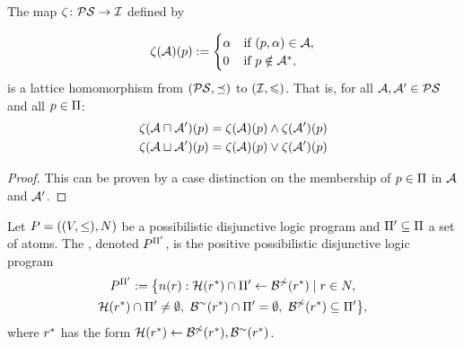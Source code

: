 \begin{proposition}
    The map $\PintToFint\colon\Pint\to\Fint$ defined by

    \[
        \PintToFint(\pint)(\atom)\eqdef
        \begin{cases}
            \lelem & \text{if } (\atom, \lelem) \in\pint, \\
            \least & \text{if } \atom\notin \proj[\pint],
        \end{cases}
    \]
    is a lattice homomorphism from $(\Pint,\possleq)$ to $(\Fint,\lleq)$.
    That is, for all $\pint,\pintalt\in\Pint$ and all $\atom\in \Atoms$:
    \begin{align}
        \PintToFint(\pint\possglb\pintalt)(\atom) & = \PintToFint(\pint)(\atom)\glb\PintToFint(\pintalt)(\atom) \\
        \PintToFint(\pint\posslub\pintalt)(\atom) & = \PintToFint(\pint)(\atom)\lub\PintToFint(\pintalt)(\atom)
    \end{align}
    \begin{proof}
        This can be proven by a case distinction on the membership of  $\atom\in\Atoms$ in $\pint$ and $\pintalt$.

    \end{proof}
\end{proposition}

Let $\pflp = \tuple{(\lset,\leq),\pRules}$ be a possibilistic disjunctive logic program and $\Atomsalt\subseteq\Atoms$ a set of atoms.
The , denoted $\pred{\pflp}{\Atomsalt}$, is the positive possibilistic disjunctive logic program
\begin{multline*}
    \pred{\pflp}{\Atomsalt} \eqdef \bigl\{\projrule[\prule] : \head(\proj[\prule])\cap\Atomsalt \lpif \pbody(\proj[\prule]) \mid \prule\in\pRules,\\
    \head(\proj[\prule])\cap\Atomsalt\neq\emptyset,\ \nbody(\proj[\prule])\cap\Atomsalt=\emptyset,\ \pbody(\proj[\prule])\subseteq\Atomsalt \bigr\},
\end{multline*}
where $\proj[\prule]$ has the form $\head(\proj[\prule])\lpif\pbody(\proj[\prule]),\nbody(\proj[\prule])$.

